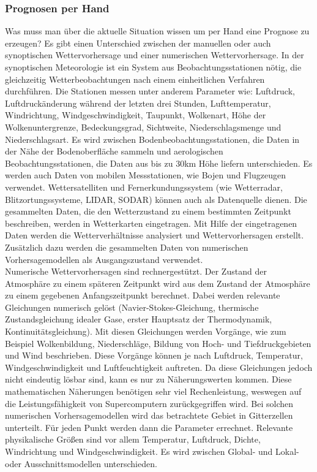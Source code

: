 \subsubsection{Prognosen per Hand} %
Was muss man über die aktuelle Situation wissen um per Hand eine Prognose zu erzeugen?
Es gibt einen Unterschied zwischen der manuellen oder auch synoptischen Wettervorhersage und einer numerischen Wettervorhersage.
In der synoptischen Meteorologie ist ein System aus Beobachtungsstationen nötig, die gleichzeitig Wetterbeobachtungen nach einem einheitlichen Verfahren durchführen.
Die Stationen messen unter anderem Parameter wie:
Luftdruck, Luftdruckänderung während der letzten drei Stunden, Lufttemperatur, Windrichtung, Windgeschwindigkeit, Taupunkt, Wolkenart, Höhe der Wolkenuntergrenze, Bedeckungsgrad, Sichtweite, Niederschlagsmenge und Niederschlagsart.
Es wird zwischen Bodenbeobachtungsstationen, die Daten in der Nähe der Bodenoberfläche sammeln und aerologischen Beobachtungsstationen, die Daten aus bis zu 30km Höhe liefern unterschieden.
Es werden auch Daten von mobilen Messstationen, wie Bojen und Flugzeugen verwendet.
Wettersatelliten und Fernerkundungssystem (wie Wetterradar, Blitzortungssysteme, LIDAR, SODAR) können auch als Datenquelle dienen.
Die gesammelten Daten, die den Wetterzustand zu einem bestimmten Zeitpunkt beschreiben, werden in Wetterkarten eingetragen.
Mit Hilfe der eingetragenen Daten werden die Wetterverhältnisse analysiert und Wettervorhersagen erstellt.
Zusätzlich dazu werden die gesammelten Daten von numerischen Vorhersagemodellen als Ausgangszustand verwendet. %
\\
Numerische Wettervorhersagen sind rechnergestützt.
Der Zustand der Atmosphäre zu einem späteren Zeitpunkt wird aus dem Zustand der Atmosphäre zu einem gegebenen Anfangszeitpunkt berechnet.
Dabei werden relevante Gleichungen numerisch gelöst (Navier-Stokes-Gleichung, thermische Zustandsgleichung idealer Gase, erster Hauptsatz der Thermodynamik, Kontinuitätsgleichung).
Mit diesen Gleichungen werden Vorgänge, wie zum Beispiel Wolkenbildung, Niederschläge, Bildung von Hoch-  und Tiefdruckgebieten und Wind beschrieben. Diese Vorgänge können je nach Luftdruck, Temperatur, Windgeschwindigkeit und Luftfeuchtigkeit auftreten.
Da diese Gleichungen jedoch nicht eindeutig lösbar sind, kann es nur zu Näherungswerten kommen. Diese mathematischen Näherungen benötigen sehr viel Rechenleistung, weswegen auf die Leistungsfähigkeit von Supercomputern zurückgegriffen wird.
Bei solchen numerischen Vorhersagemodellen wird das betrachtete Gebiet in Gitterzellen unterteilt.
Für jeden Punkt werden dann die Parameter errechnet.
Relevante physikalische Größen sind vor allem Temperatur, Luftdruck, Dichte, Windrichtung und Windgeschwindigkeit.
Es wird zwischen Global- und Lokal- oder Ausschnittsmodellen unterschieden.

